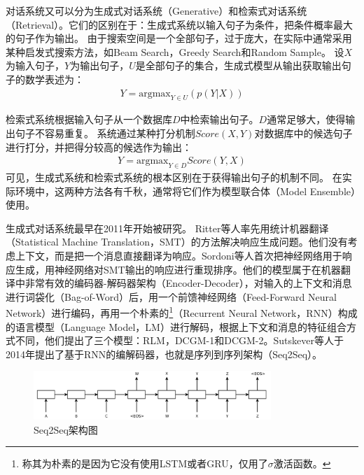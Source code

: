 对话系统又可以分为生成式对话系统（Generative）和检索式对话系统（Retrieval）。它们的区别在于：生成式系统以输入句子为条件，把条件概率最大的句子作为输出。
由于搜索空间是一个全部句子，过于庞大，在实际中通常采用某种启发式搜索方法，如Beam Search，Greedy Search和Random Sample。
设$X$为输入句子，$Y$为输出句子，$U$是全部句子的集合，生成式模型从输出获取输出句子的数学表述为：
\begin{align}
    Y = \text{argmax}_{Y\in U} \left(p(Y|X)\right)
\end{align}

检索式系统根据输入句子从一个数据库$D$中检索输出句子。$D$通常足够大，使得输出句子不容易重复。
系统通过某种打分机制$Score(X, Y)$对数据库中的候选句子进行打分，并把得分较高的候选作为输出：
\begin{align}
    Y = \text{argmax}_{Y\in D} Score(Y, X)
\end{align}
可见，生成式系统和检索式系统的根本区别在于获得输出句子的机制不同。
在实际环境中，这两种方法各有千秋，通常将它们作为模型联合体（Model Ensemble）使用。

生成式对话系统最早在2011年开始被研究。
Ritter等人率先用统计机器翻译（Statistical Machine Translation，SMT）的方法解决响应生成问题。他们没有考虑上下文，而是把一个消息直接翻译为响应。Sordoni等人首次把神经网络用于响应生成，用神经网络对SMT输出的响应进行重现排序。他们的模型属于在机器翻译中非常有效的编码器-解码器架构（Encoder-Decoder），对输入的上下文和消息进行词袋化（Bag-of-Word）后，用一个前馈神经网络（Feed-Forward Neural Network）进行编码，再用一个朴素的\footnote{称其为朴素的是因为它没有使用LSTM或者GRU，仅用了$\sigma$激活函数。}（Recurrent Neural Network，RNN）构成的语言模型（Language Model，LM）进行解码，根据上下文和消息的特征组合方式不同，他们提出了三个模型：RLM，DCGM-1和DCGM-2。Sutskever等人于2014年提出了基于RNN的编解码器，也就是序列到序列架构（Seq2Seq）。

\begin{figure}[H]
    \centering
    \includegraphics[width=0.8\textwidth]{figure/Seq2Seq.png}
    \caption{Seq2Seq架构图}
    \label{fig:Seq2Seq}
\end{figure}

